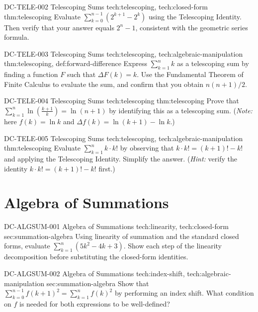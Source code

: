 \exstubgenfull
  {DC-TELE-002}
  {Telescoping Sums}
  {tech:telescoping, tech:closed-form}
  {thm:telescoping}
  {Evaluate \(\displaystyle\sum_{k=0}^{n-1}(2^{k+1} - 2^k)\) using the
  Telescoping Identity. Then verify that your answer equals \(2^n - 1\),
  consistent with the geometric series formula.}

\exstubgenfull
  {DC-TELE-003}
  {Telescoping Sums}
  {tech:telescoping, tech:algebraic-manipulation}
  {thm:telescoping, def:forward-difference}
  {Express \(\displaystyle\sum_{k=1}^{n}k\) as a telescoping sum by
  finding a function \(F\) such that \(\Delta F(k) = k\). Use the
  Fundamental Theorem of Finite Calculus to evaluate the sum, and
  confirm that you obtain \(n(n+1)/2\).}

\exstubgenfull
  {DC-TELE-004}
  {Telescoping Sums}
  {tech:telescoping}
  {thm:telescoping}
  {Prove that
  \(\displaystyle\sum_{k=1}^{n}\ln\!\left(\frac{k+1}{k}\right) = \ln(n+1)\)
  by identifying this as a telescoping sum. (\emph{Note:} here \(f(k) = \ln k\)
  and \(\Delta f(k) = \ln(k+1) - \ln k\).)}

\exstubgenfull
  {DC-TELE-005}
  {Telescoping Sums}
  {tech:telescoping, tech:algebraic-manipulation}
  {thm:telescoping}
  {Evaluate \(\displaystyle\sum_{k=1}^{n}k\cdot k!\) by observing that
  \(k\cdot k! = (k+1)! - k!\) and applying the Telescoping Identity.
  Simplify the answer. (\emph{Hint:} verify the identity \(k\cdot k! = (k+1)! - k!\)
  first.)}

\section*{Algebra of Summations}

\exstubgenfull
  {DC-ALGSUM-001}
  {Algebra of Summations}
  {tech:linearity, tech:closed-form}
  {sec:summation-algebra}
  {Using linearity of summation and the standard closed forms, evaluate
  \(\displaystyle\sum_{k=1}^{n}(5k^2 - 4k + 3)\).
  Show each step of the linearity decomposition before substituting
  the closed-form identities.}

\exstubgenfull
  {DC-ALGSUM-002}
  {Algebra of Summations}
  {tech:index-shift, tech:algebraic-manipulation}
  {sec:summation-algebra}
  {Show that \(\displaystyle\sum_{k=0}^{n-1} f(k+1)^2 = \sum_{k=1}^{n} f(k)^2\)
  by performing an index shift. What condition on \(f\) is needed
  for both expressions to be well-defined?}

